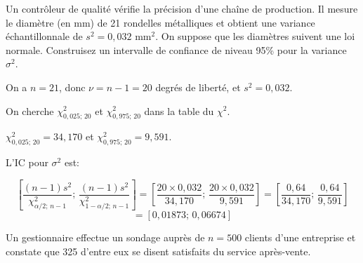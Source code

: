 \begin{questions}


\pageblanche
\question[10]\label{variance} Un contrôleur de qualité vérifie la précision d'une chaîne de production. Il mesure le diamètre (en mm) de 21 rondelles métalliques et obtient une variance échantillonnale de $s^2=0{,}032$ mm$^2$. On suppose que les diamètres suivent une loi normale. Construisez un intervalle de confiance de niveau 95\% pour la variance $\sigma^2$.

\begin{solution}
On a $n=21$, donc $\nu=n-1=20$ degrés de liberté, et $s^2=0{,}032$.

On cherche $\chi^2_{0{,}025;\,20}$ et $\chi^2_{0{,}975;\,20}$ dans la table du $\chi^2$.

$\chi^2_{0{,}025;\,20}=34{,}170$ et $\chi^2_{0{,}975;\,20}=9{,}591$.

L'IC pour $\sigma^2$ est:

$$\left[\frac{(n-1)s^2}{\chi^2_{\alpha/2;\,n-1}};\, \frac{(n-1)s^2}{\chi^2_{1-\alpha/2;\,n-1}}\right]=\left[\frac{20\times 0{,}032}{34{,}170};\, \frac{20\times 0{,}032}{9{,}591}\right]=\left[\frac{0{,}64}{34{,}170};\, \frac{0{,}64}{9{,}591}\right]$$
$$=[0{,}01873;\, 0{,}06674]$$
\end{solution}



\pageblanche
\question\label{proportion} Un gestionnaire effectue un sondage auprès de $n=500$ clients d'une entreprise et constate que 325 d'entre eux se disent satisfaits du service après-vente.


\end{questions}
